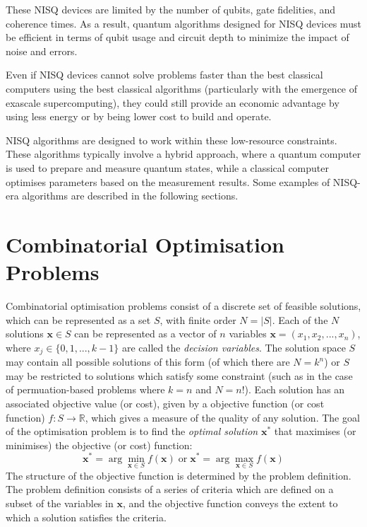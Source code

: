 These NISQ devices are limited by the number of qubits, gate fidelities, and coherence times. As a result, quantum algorithms designed for NISQ devices must be efficient in terms of qubit usage and circuit depth to minimize the impact of noise and errors. 

Even if NISQ devices cannot solve problems faster than the best classical computers using the best classical algorithms (particularly with the emergence of exascale supercomputing), they could still provide an economic advantage by using less energy or by being lower cost to build and operate.

NISQ algorithms are designed to work within these low-resource constraints. These algorithms typically involve a hybrid approach, where a quantum computer is used to prepare and measure quantum states, while a classical computer optimises parameters based on the measurement results. Some examples of NISQ-era algorithms are described in the following sections.

\section{Combinatorial Optimisation Problems}\label{sec:cop}
Combinatorial optimisation problems consist of a discrete set of feasible solutions, which can be represented as a set $S$, with finite order $N=|S|$. Each of the $N$ solutions $\mathbf{x} \in S$ can be represented as a vector of $n$ variables $\mathbf{x}=(x_1, x_2,...,x_n)$, where $x_j\in\{0,1,...,k-1\}$ are called the \textit{decision variables}. The solution space $S$ may contain all possible solutions of this form (of which there are $N=k^n$) or $S$ may be restricted to solutions which satisfy some constraint (such as in the case of permuation-based problems where $k=n$ and $N=n!$). Each solution has an associated objective value (or cost), given by a objective function (or cost function) $f:S\rightarrow\mathbb{R}$, which gives a measure of the quality of any solution. The goal of the optimisation problem is to find the \textit{optimal solution} $\mathbf{x}^*$ that maximises (or minimises) the objective (or cost) function:
$$\mathbf{x}^* = \arg\min_{\mathbf{x} \in S} f(\mathbf{x})
\;\text{or}\;
\mathbf{x}^* = \arg\max_{\mathbf{x} \in S} f(\mathbf{x})$$
The structure of the objective function is determined by the problem definition. The problem definition consists of a series of criteria which are defined on a subset of the variables in $\mathbf{x}$, and the objective function conveys the extent to which a solution satisfies the criteria.

